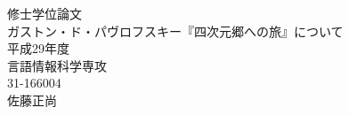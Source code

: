 \begin{titlepage}
\begin{center}
{\huge 修士学位論文}\\
\vspace*{150truept}
{\huge ガストン・ド・パヴロフスキー『四次元郷への旅』について}\\ %
\vspace{10truept}
\vspace{120truept}
{\large 平成29年度}\\ %
\vspace{50truept}
{\large 言語情報科学専攻}\\
\vspace{50truept}
{\large 31-166004}\\ %
\vspace{50truept}
{\large 佐藤正尚}\\ %
\end{center}
\end{titlepage}
